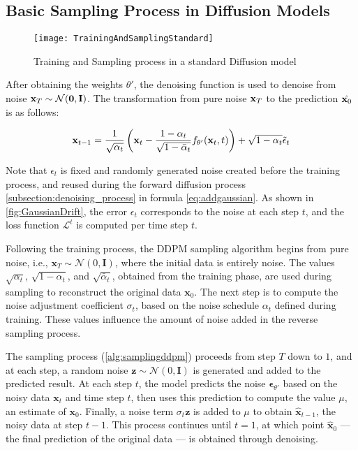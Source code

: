 \subsection{Basic Sampling Process in Diffusion Models}

\begin{figure*}
	\centering
	\texttt{[image: TrainingAndSamplingStandard]}
	\caption{Training and Sampling process in a standard Diffusion model}
	\label{fig:GaussianDrift}
\end{figure*}

After obtaining the weights $\theta'$, the denoising function is used to denoise from noise $\mathbf{x}_T \sim \mathcal{N} (\mathbf{0}, \mathbf{I})$.  
The transformation from pure noise $\mathbf{x}_{T}$ to the prediction $\hat{\mathbf{x}_0}$ is as follows:

\begin{equation}
	\label{eq:adddenoising}
	\mathbf{x}_{t-1} = \frac{1}{\sqrt{\alpha_t}} \left( \mathbf{x}_t - \frac{1- \alpha_t}{\sqrt{1 - \bar{\alpha}_t}} f_{\theta'}(\mathbf{x}_t, t) \right) + \sqrt{1 - \alpha_t} \tilde{\epsilon}_t
\end{equation}

Note that $\epsilon_t$ is fixed and randomly generated noise created before the training process, and reused during the forward diffusion process \autoref{subsection:denoising_process} in formula \autoref{eq:addgaussian}. As shown in \autoref{fig:GaussianDrift}, the error $\epsilon_t$ corresponds to the noise at each step $t$, and the loss function $\mathcal{L}^{t}$ is computed per time step $t$.

Following the training process, the DDPM sampling algorithm begins from pure noise, i.e., $\mathbf{x}_T \sim \mathcal{N}(0, \mathbf{I})$, where the initial data is entirely noise. The values $\sqrt{\alpha_t}$, $\sqrt{1 - \alpha_t}$, and $\sqrt{\bar{\alpha}_t}$, obtained from the training phase, are used during sampling to reconstruct the original data $\mathbf{x}_0$. The next step is to compute the noise adjustment coefficient $\sigma_t$, based on the noise schedule $\alpha_t$ defined during training. These values influence the amount of noise added in the reverse sampling process.

The sampling process (\autoref{alg:samplingddpm}) proceeds from step $T$ down to $1$, and at each step, a random noise $\mathbf{z} \sim \mathcal{N}(0, \mathbf{I})$ is generated and added to the predicted result. At each step $t$, the model predicts the noise $\boldsymbol{\epsilon}_{\theta'}$ based on the noisy data $\mathbf{x}_t$ and time step $t$, then uses this prediction to compute the value $\mu$, an estimate of $\mathbf{x}_0$. Finally, a noise term $\sigma_t \mathbf{z}$ is added to $\mu$ to obtain $\hat{\mathbf{x}}_{t-1}$, the noisy data at step $t-1$. This process continues until $t = 1$, at which point $\hat{\mathbf{x}}_0$ — the final prediction of the original data — is obtained through denoising.

